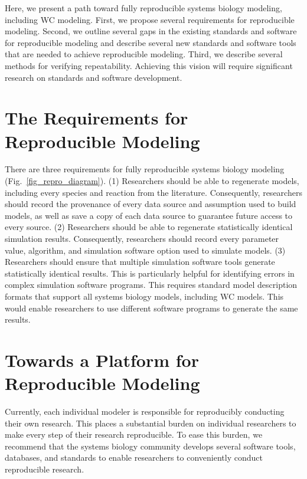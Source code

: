 \documentclass[journal,transmag,twoside]{IEEEtran}
\begin{document}
Here, we present a path toward fully reproducible systems biology modeling, including WC modeling. First, we propose several requirements for reproducible modeling. Second, we outline several gaps in the existing standards and software for reproducible modeling and describe several new standards and software tools that are needed to achieve reproducible modeling. Third, we describe several methods for verifying repeatability. Achieving this vision will require significant research on standards and software development.

\section{The Requirements for Reproducible Modeling}

There are three requirements for fully reproducible systems biology modeling (Fig.~\ref{fig_repro_diagram}). (1) Researchers should be able to regenerate models, including every species and reaction from the literature. Consequently, researchers should record the provenance of every data source and assumption used to build models, as well as save a copy of each data source to guarantee future access to every source. (2) Researchers should be able to regenerate statistically identical simulation results. Consequently, researchers should record every parameter value, algorithm, and simulation software option used to simulate models. (3) Researchers should ensure that multiple simulation software tools generate statistically identical results. This is particularly helpful for identifying errors in complex simulation software programs. This requires standard model description formats that support all systems biology models, including WC models. This would enable researchers to use different software programs to generate the same results.

\section{Towards a Platform for Reproducible Modeling}

Currently, each individual modeler is responsible for reproducibly conducting their own research. This places a substantial burden on individual researchers to make every step of their research reproducible. To ease this burden, we recommend that the systems biology community develops several software tools, databases, and standards to enable researchers to conveniently conduct reproducible research.
\end{document}

